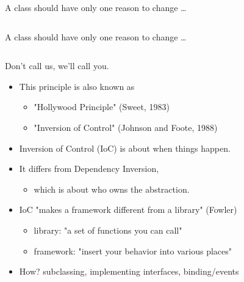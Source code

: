 \documentclass{beamer}
\begin{document}
\begin{frame}{A class should have only one reason to change \ldots}
    \vspace{0cm}
    \begin{columns}
        \column{\dimexpr\paperwidth-40pt}
        
    \end{columns}
\end{frame}

\begin{frame}{A class should have only one reason to change \ldots}
    \vspace{0cm}
    \begin{columns}
        \column{\dimexpr\paperwidth-40pt}
        
    \end{columns}
\end{frame}

\begin{frame}{Don't call us, we'll call you.}
    \begin{itemize}
        \item This principle is also known as
            \begin{itemize}
                \item "Hollywood Principle" (Sweet, 1983)
                \item "Inversion of Control" (Johnson and Foote, 1988)
            \end{itemize}
        \item Inversion of Control (IoC) is about when things happen.
        \item It differs from Dependency Inversion, 
            \begin{itemize}
                \item which is about who owns the abstraction.
            \end{itemize}
        \item IoC "makes a framework different from a library" (Fowler)
            \begin{itemize}
                \item library: "a set of functions you can call"
                \item framework: "insert your behavior into various places"
            \end{itemize}
        \item How? subclassing, implementing interfaces, binding/events
    \end{itemize}
\end{frame}
\end{document}
